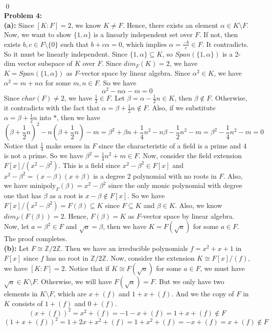 \documentclass[12pt]{amsart}
\newcommand{\Z}{\mathbb{Z}}
\begin{document}
\\\qed\\
\textbf{Problem 4:}\\
\textbf{(a):} Since $[K:F]=2$, we know $K\neq F$. Hence, there exists an element $\alpha\in K\setminus F$. Now, we want to show $\{1,\alpha\}$ is a linearly independent set over $F$. If not, then exists $b,c\in F\setminus\{0\}$ such that $b+c\alpha=0$, which implies $\alpha=\frac{-b}{c}\in F$. It contradicts. So it must be linearly independent. Since $\{1,\alpha\}\subseteq K$, so $Span(\{1,\alpha\})$ is a 2-dim vector subspace of $K$ over $F$. Since $dim_F(K)=2$, we have $K=Span(\{1,\alpha\})$ as $F$-vector space by linear algebra. Since $\alpha^2\in K$, we have $\alpha^2=m+n\alpha$ for some $m,n\in F$. So we have 
\[\alpha^2-n\alpha-m=0\tag{ast}\]
Since $char(F)\neq 2$, we have $\frac{1}{2}\in F$. Let $\beta=\alpha-\frac{1}{2}n\in K$, then $\beta\notin F$. Otherwise, it contradicts with the fact that $\alpha=\beta+\frac{1}{2}n\notin F$. Also, if we substitute $\alpha=\beta+\frac{1}{2}n$ into $\ast$, then we have
\[(\beta+\frac{1}{2}n)^2-n(\beta+\frac{1}{2}n)-m=\beta^2+\beta n+\frac{1}{4}n^2-n\beta -\frac{1}{2}n^2-m=\beta^2-\frac{1}{4}n^2-m=0\]
Notice that $\frac{1}{4}$ make senses in $F$ since the characteristic of a field is a prime and 4 is not a prime. So we have $\beta^2=\frac{1}{4}n^2+m\in F$. Now, consider the field extension $F[x]/(x^2-\beta^2)$. This is a field since $x^2-\beta^2\in F[x]$ and $x^2-\beta^2=(x-\beta)(x+\beta)$ is a degree 2 polynomial with no roots in $F$. Also, we have $\textrm{minipoly}_F(\beta)=x^2-\beta^2$ since the only monic polynomial with degree one that has $\beta$ as a root is $x-\beta\notin F[x]$. So we have $F[x]/(x^2-\beta^2)=F(\beta)\subseteq K$ since $F\subseteq K$ and $\beta\in K$. Also, we know $dim_F(F(\beta))=2$. Hence, $F(\beta)=K$ as $F$-vector space by linear algebra. Now, let $a=\beta^2\in F$ and $\sqrt{a}=\beta$, then we have $K=F(\sqrt{a})$ for some $a\in F$. The proof completes. \\
\textbf{(b):} Let $F\cong \Z/2\Z$. Then we have an irreducible polynomials $f= x^2+x+1$ in $F[x]$ since $f$ has no root in $\Z/2\Z$. Now, consider the extension $K\cong F[x]/(f)$, we have $[K:F]=2$. Notice that if $K\cong F(\sqrt{a})$ for some $a\in F$, we must have $\sqrt{a}\in K\setminus F$. Otherwise, we will have $F(\sqrt{a})=F$. But we only have two elements in $K\setminus F$, which are $x+(f)$ and $1+x+(f)$. And we the copy of $F$ in $K$ consists of $1+(f)$ and $0+(f)$. 
\[(x+(f))^2=x^2+(f)=-1-x+(f)=1+x+(f)\notin F\]
\[(1+x+(f))^2=1+2x+x^2+(f)=1+x^2+(f)=-x+(f)=x+(f)\notin F\]
\end{document}
